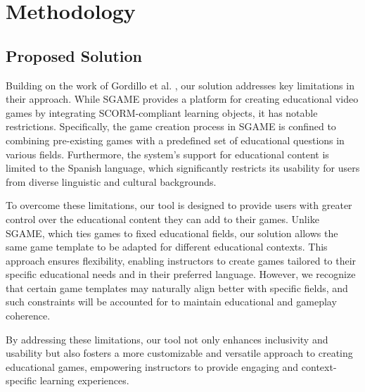\chapter{Methodology}\label{chap:method}

\section{Proposed Solution}

Building on the work of Gordillo et al. \cite{sgame2020}, our solution addresses key limitations in their approach. While SGAME provides a platform for creating educational video games by integrating SCORM-compliant learning objects, it has notable restrictions. Specifically, the game creation process in SGAME is confined to combining pre-existing games with a predefined set of educational questions in various fields. Furthermore, the system’s support for educational content is limited to the Spanish language, which significantly restricts its usability for users from diverse linguistic and cultural backgrounds.

To overcome these limitations, our tool is designed to provide users with greater control over the educational content they can add to their games. Unlike SGAME, which ties games to fixed educational fields, our solution allows the same game template to be adapted for different educational contexts. This approach ensures flexibility, enabling instructors to create games tailored to their specific educational needs and in their preferred language. However, we recognize that certain game templates may naturally align better with specific fields, and such constraints will be accounted for to maintain educational and gameplay coherence.

By addressing these limitations, our tool not only enhances inclusivity and usability but also fosters a more customizable and versatile approach to creating educational games, empowering instructors to provide engaging and context-specific learning experiences.

